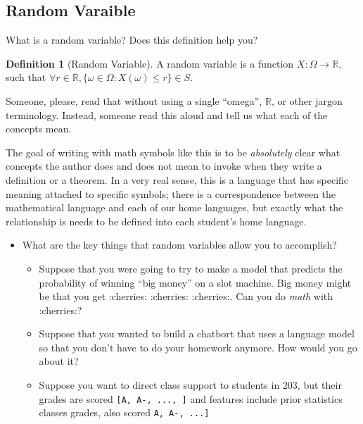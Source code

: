\documentclass[
]{book}
\providecommand{\tightlist}{%
  \setlength{\itemsep}{0pt}\setlength{\parskip}{0pt}}
\theoremstyle{definition}
\newtheorem{definition}{Definition}[chapter]
\theoremstyle{definition}
\theoremstyle{definition}
\theoremstyle{definition}
\theoremstyle{remark}
\begin{document}
\subsection{Random Varaible}\label{random-varaible}

What is a random variable? Does this definition help you?

\begin{definition}[Random Variable]
A random variable is a function \(X : \Omega \rightarrow \mathbb{R},\) such that \(\forall r \in \mathbb{R}, \{\omega \in \Omega: X(\omega) \leq r\} \in S\).
\end{definition}

Someone, please, read that without using a single ``omega'', \(\mathbb{R}\), or other jargon terminology. Instead, someone read this aloud and tell us what each of the concepts mean.

The goal of writing with math symbols like this is to be \emph{absolutely} clear what concepts the author does and does not mean to invoke when they write a definition or a theorem. In a very real sense, this is a language that has specific meaning attached to specific symbols; there is a correspondence between the mathematical language and each of our home languages, but exactly what the relationship is needs to be defined into each student's home language.

\begin{itemize}
\tightlist
\item
  What are the key things that random variables allow you to accomplish?

  \begin{itemize}
  \tightlist
  \item
    Suppose that you were going to try to make a model that predicts the probability of winning ``big money'' on a slot machine. Big money might be that you get :cherries: :cherries: :cherries:. Can you do \emph{math} with :cherries:?
  \item
    Suppose that you wanted to build a chatbort that uses a language model so that you don't have to do your homework anymore. How would you go about it?
  \item
    Suppose you want to direct class support to students in 203, but their grades are scored \texttt{{[}A,\ A-,\ ...,\ {]}} and features include prior statistics classes grades, also scored \texttt{A,\ A-,\ ...{]}}
  \end{itemize}
\end{itemize}
\end{document}
